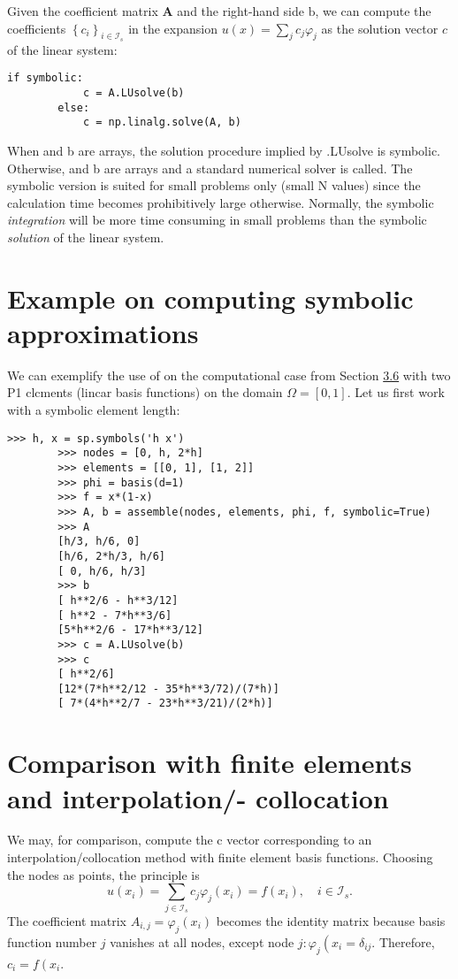\documentclass[../main.tex]{subfiles}
\begin{document}
	Given the coefficient matrix $\mathrm{\textbf{A}}$ and the right-hand side $\mathrm{b}$, we can compute the coefficients $\left\{c_{i}\right\}_{i \in \mathcal{I}_{s}}$ in the expansion $u(x)=\sum_{j} c_{j} \varphi_{j}$ as the solution vector $c$ of the linear system:
	\begin{lstlisting}[numbers=none]
		if symbolic:
			c = A.LUsolve(b)
		else:
			c = np.linalg.solve(A, b)
	\end{lstlisting}
	When  and b are  arrays, the solution procedure implied by .LUsolve is
	symbolic. Otherwise,  and b are  arrays and a standard numerical solver
	is called. The symbolic version is suited for small problems only (small N values)
	since the calculation time becomes prohibitively large otherwise. Normally, the
	symbolic \textit{integration}  will be more time consuming in small problems than the
	symbolic \textit{solution} of the linear system.
	\section[Example on computing symbolic approximations]{Example on computing symbolic approximations}
	\label{sec:sec_4_3}
	We can exemplify the use of  on the computational case from Section \hyperref[sec:sec_3_6]{3.6} with two P1 clcments (lincar basis functions) on the domain $\Omega=[0,1]$. Let us first work with a symbolic element length:
	\begin{lstlisting}[numbers=none]
		>>> h, x = sp.symbols('h x')
		>>> nodes = [0, h, 2*h]
		>>> elements = [[0, 1], [1, 2]]
		>>> phi = basis(d=1)
		>>> f = x*(1-x)
		>>> A, b = assemble(nodes, elements, phi, f, symbolic=True)
		>>> A
		[h/3, h/6, 0]
		[h/6, 2*h/3, h/6]
		[ 0, h/6, h/3]
		>>> b
		[ h**2/6 - h**3/12]
		[ h**2 - 7*h**3/6]
		[5*h**2/6 - 17*h**3/12]
		>>> c = A.LUsolve(b)
		>>> c
		[ h**2/6]
		[12*(7*h**2/12 - 35*h**3/72)/(7*h)]
		[ 7*(4*h**2/7 - 23*h**3/21)/(2*h)]	
	\end{lstlisting}
	\section[Comparison with finite elements and interpolation/- collocation]{Comparison with finite elements and interpolation/- collocation}
	\label{sec:sec_4_4}
	We may, for comparison, compute the c vector corresponding to an interpolation/collocation method with finite element basis functions. Choosing the nodes as points, the principle is
	$$
	u\left(x_{i}\right)=\sum_{j \in \mathcal{I}_{s}} c_{j} \varphi_{j}\left(x_{i}\right)=f\left(x_{i}\right), \quad i \in \mathcal{I}_{s}.
	$$
	The coefficient matrix $A_{i, j}=\varphi_{j}\left(x_{i}\right)$ becomes the identity matrix because basis function number $j$ vanishes at all nodes, except node $j: \varphi_{j}\left(x_{i}=\delta_{i j}\right.$. Therefore, $c_{i}=f\left(x_{i}\right.$.
	
\end{document}
